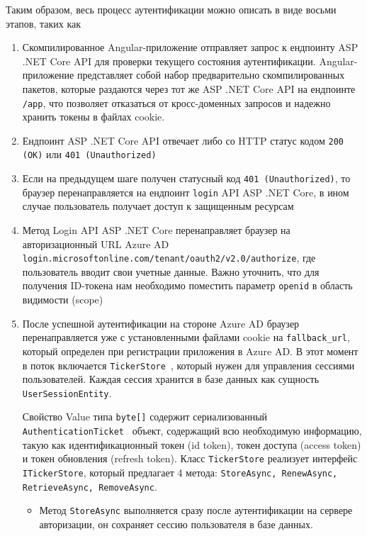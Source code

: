 Таким образом, весь процесс аутентификации можно описать в виде восьми этапов, таких как
\begin{enumerate}
    \item Скомпилированное Angular-приложение отправляет запрос к ендпоинту ASP .NET Core API для проверки текущего состояния аутентификации.
    Angular-приложение представляет собой набор предварительно скомпилированных пакетов, которые раздаются через тот же ASP .NET Core API
    на ендпоинте \texttt{/app}, что позволяет отказаться от кросс-доменных запросов и надежно хранить токены в файлах cookie.
    \item Ендпоинт ASP .NET Core API отвечает либо со HTTP статус кодом \texttt{200 (OK)} или \texttt{401 (Unauthorized)}
    \item Если на предыдущем шаге получен статусный код \texttt{401 (Unauthorized)}, то браузер перенаправляется
    на ендпоинт \texttt{login} API ASP .NET Core, в ином случае пользователь получает доступ к защищенным ресурсам
    \item Метод Login API ASP .NET Core перенаправляет браузер на авторизационный URL Azure AD \texttt{login.microsoftonline.com/tenant/oauth2/v2.0/authorize},
    где пользователь вводит свои учетные данные.
    Важно уточнить, что для получения ID-токена нам необходимо поместить параметр \texttt{openid} в область видимости (scope)
    
    \item После успешной аутентификации на стороне Azure AD браузер перенаправляется уже с установленными файлами cookie на \texttt{fallback\_url},
    который определен при регистрации приложения в Azure AD\@.
    В этот момент в поток включается \texttt{TickerStore}~\cite{microsoftIticketstore2023, ticketStore_2023}, который нужен для управления сессиями пользователей.
    Каждая сессия хранится в базе данных как сущность \texttt{UserSessionEntity}.
    
    Свойство Value типа \texttt{byte[]} содержит сериализованный \texttt{AuthenticationTicket}~\cite{microsoftAuthenticationTicket2023}
    объект, содержащий всю необходимую информацию, такую как идентификационный токен (id token), токен доступа (access token) и токен обновления (refresh token).
    Класс \texttt{TickerStore} реализует интерфейс \texttt{ITickerStore}, который предлагает 4 метода: \texttt{StoreAsync, RenewAsync, RetrieveAsync, RemoveAsync}.
    \begin{itemize}
        \item Метод \texttt{StoreAsync} выполняется сразу после аутентификации на сервере авторизации, он сохраняет сессию пользователя в базе данных.

\end{itemize}
\end{enumerate}
